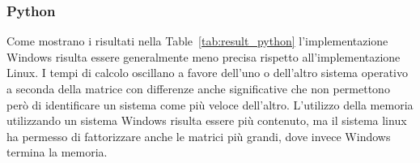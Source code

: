 \documentclass[a4paper, 12pt]{article}
\begin{document}
            \subsubsection{Python}
                Come mostrano i risultati nella Table~\ref{tab:result_python} l'implementazione Windows risulta essere 
                generalmente meno precisa rispetto all'implementazione Linux. 
                I tempi di calcolo oscillano a favore dell'uno o dell'altro sistema operativo a seconda della matrice
                con differenze anche significative che non permettono però di identificare un sistema come più
                veloce dell'altro.
                L'utilizzo della memoria utilizzando un sistema Windows risulta essere più contenuto, ma il sistema
                linux ha permesso di fattorizzare anche le matrici più grandi, dove invece Windows termina la memoria.
\end{document}
